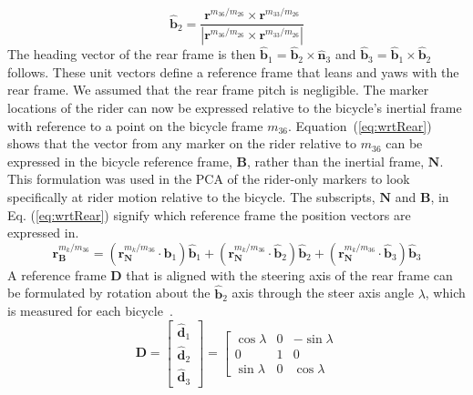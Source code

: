 \documentclass[smallextended]{svjour3}     %
\begin{document}
\begin{appendices}
\begin{equation}
\hat{\mathbf{b}}_2=
\frac{\mathbf{r}^{{m_{36}}/m_{26}}\times\mathbf{r}^{{m_{33}}/m_{26}}}
{|\mathbf{r}^{{m_{36}}/m_{26}}\times\mathbf{r}^{{m_{33}}/m_{26}}|}
\label{eq:b2}
\end{equation}
The heading vector of the rear frame is then
$\hat{\mathbf{b}}_1=\hat{\mathbf{b}}_2\times\hat{\mathbf{n}}_3$ and
$\hat{\mathbf{b}}_3=\hat{\mathbf{b}}_1\times\hat{\mathbf{b}}_2$ follows. These
unit vectors define a reference frame that leans and yaws with the rear frame.
We assumed that the rear frame pitch is negligible. The marker locations of the
rider can now be expressed relative to the bicycle's inertial frame with reference to a point
on the bicycle frame $m_{36}$. Equation~(\ref{eq:wrtRear}) shows that the vector from
any marker on the rider relative to $m_{36}$ can be expressed in the bicycle
reference frame, $\mathbf{B}$, rather than the inertial frame, $\mathbf{N}$.
This formulation was used in the
PCA of the rider-only markers to look specifically at rider motion relative to
the bicycle. The subscripts, $\mathbf{N}$ and $\mathbf{B}$, in Eq.
(\ref{eq:wrtRear}) signify which
reference frame the position vectors are expressed in.
\begin{equation}
    \mathbf{r}^{{m_{k}}/m_{36}}_\mathbf{B}=
    (\mathbf{r}^{{m_{k}}/m_{36}}_\mathbf{N}\cdot\hat{\mathbf{b}}_1)\hat{\mathbf{b}}_1+
    (\mathbf{r}^{{m_{k}}/m_{36}}_\mathbf{N}\cdot\hat{\mathbf{b}}_2)\hat{\mathbf{b}}_2+
    (\mathbf{r}^{{m_{k}}/m_{36}}_\mathbf{N}\cdot\hat{\mathbf{b}}_3)\hat{\mathbf{b}}_3
\label{eq:wrtRear}
\end{equation}
A reference frame $\mathbf{D}$ that is aligned with the steering axis of the
rear frame can be formulated by rotation about the $\hat{\mathbf{b}}_2$ axis
through the steer axis angle $\lambda$, which is measured for each
bicycle~\cite{Moore2009a}.
\begin{equation}
    \mathbf{D}=
    \left[
    \begin{array}{c}
    \hat{\mathbf{d}}_1\\
    \hat{\mathbf{d}}_2\\
    \hat{\mathbf{d}}_3
  \end{array}
    \right]
    =
    \left[
    \begin{array}{rrr}
    \cos{\lambda} &  0 &  -\sin{\lambda}\\
    0             &  1 &  0\\
    \sin{\lambda} &  0 & \cos{\lambda}
    \end{array}

\end{equation}
\end{appendices}
\end{document}
